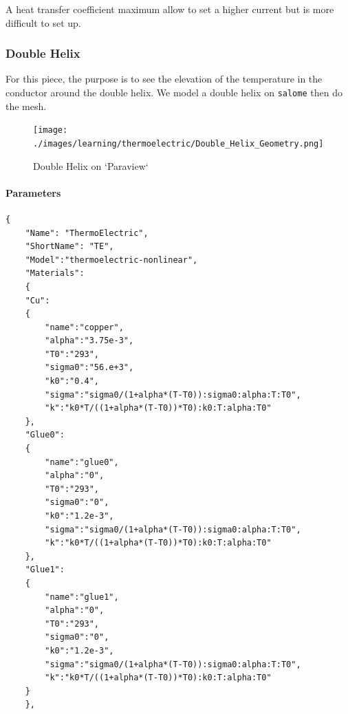 \documentclass[11pt]{amsart}
\begin{document}
A heat transfer coefficient maximum allow to set a higher current but is more difficult to set up.


\hypertarget{x-double-helix}{\subsubsection{Double Helix}}
For this piece, the purpose is to see the elevation of the temperature in the conductor around the double helix.
We model a double helix on \texttt{salome} then do the mesh.


\begin{figure}[h]{}
\centering\texttt{[image: ./images/learning/thermoelectric/Double\_Helix\_Geometry.png]}
\caption{Double Helix on `Paraview`}
\centering
\end{figure}

\hypertarget{x-parameters}{\paragraph{Parameters}}
\begin{verbatim}
{
    "Name": "ThermoElectric",
    "ShortName": "TE",
    "Model":"thermoelectric-nonlinear",
    "Materials":
    {
	"Cu":
	{
	    "name":"copper",
	    "alpha":"3.75e-3",
	    "T0":"293",
	    "sigma0":"56.e+3",
	    "k0":"0.4",
	    "sigma":"sigma0/(1+alpha*(T-T0)):sigma0:alpha:T:T0",
	    "k":"k0*T/((1+alpha*(T-T0))*T0):k0:T:alpha:T0"
	},
	"Glue0":
	{
	    "name":"glue0",
	    "alpha":"0",
	    "T0":"293",
	    "sigma0":"0",
	    "k0":"1.2e-3",
	    "sigma":"sigma0/(1+alpha*(T-T0)):sigma0:alpha:T:T0",
	    "k":"k0*T/((1+alpha*(T-T0))*T0):k0:T:alpha:T0"
	},
	"Glue1":
	{
	    "name":"glue1",
	    "alpha":"0",
	    "T0":"293",
	    "sigma0":"0",
	    "k0":"1.2e-3",
	    "sigma":"sigma0/(1+alpha*(T-T0)):sigma0:alpha:T:T0",
	    "k":"k0*T/((1+alpha*(T-T0))*T0):k0:T:alpha:T0"
	}
    },
\end{verbatim}
\end{document}
